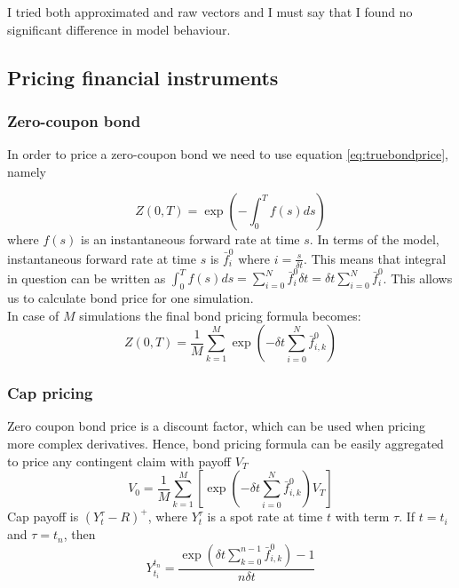\documentclass[11pt]{article} %
\begin{document}
I tried both approximated and raw vectors and I must say that I found no significant difference in model behaviour.

\subsection{Pricing financial instruments}

\subsubsection{Zero-coupon bond}
In order to price a zero-coupon bond we need to use equation \ref{eq:truebondprice}, namely

\[Z(0,T) = \exp\left(-\int_{0}^{T}{f(s)ds}\right)\]
where $f(s)$ is an instantaneous forward rate at time $s$. In terms of the model, instantaneous forward rate at time $s$ is $\bar{f}_i^0$ where $i = \frac{s}{\delta t}$. This means that integral in question can be written as $\int_{0}^{T}{f(s)ds} = \sum_{i=0}^N \bar{f}_i^0 \delta t = \delta t \sum_{i=0}^N \bar{f}_i^0$. This allows us to calculate bond price for one simulation.\\ In case of $M$ simulations the final bond pricing formula becomes: \\
\begin{equation}
Z(0,T) = \frac{1}{M}\sum_{k=1}^{M}\exp\left(-\delta t \sum_{i=0}^N \bar{f}_{i,k}^0\right)
\end{equation}

\subsubsection{Cap pricing}
Zero coupon bond price is a discount factor, which can be used when pricing more complex derivatives. Hence, bond pricing formula can be easily aggregated to price any contingent claim with payoff $V_T$
\begin{equation}
V_0 = \frac{1}{M}\sum_{k=1}^{M}\left[\exp\left(-\delta t \sum_{i=0}^N \bar{f}_{i,k}^0\right)V_T\right]
\end{equation}
Cap payoff is $(Y_t^\tau - R)^+$, where $Y_t^\tau$ is a spot rate at time $t$ with term $\tau$. If $t = t_i$ and $\tau = t_n$, then 
\begin{equation}
Y_{t_i}^{t_n} = \frac{\exp\left(\delta t\sum_{k=0}^{n-1}\bar{f}_{i,k}^0\right)-1}{n \delta t}
\end{equation}

\end{document}
